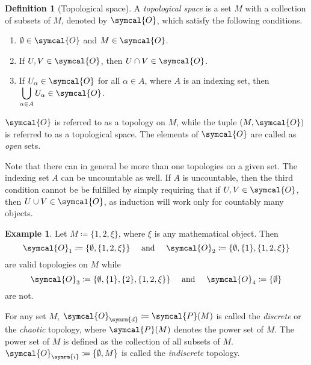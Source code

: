 \documentclass[a4 paper, 12pt]{book}
\theoremstyle{definition}
\newtheorem{defn}{Definition}
\newtheorem{exmp}{Example}
\newcommand{\topology}{\symcal{O}}
\newcommand{\powerset}{\symcal{P}}
\begin{document}
    \begin{defn}[Topological space]
        A \textit{topological space} is a set \(M\) with a collection of subsets of \(M\), denoted by \(\topology\), which satisfy the following conditions.
        \begin{enumerate}
            \item \(\emptyset \in \topology\) and \(M \in \topology\).
            \item If \(U, V \in \topology\), then \(U \cap V \in \topology\).
            \item If \(U_\alpha \in \topology\) for all \(\alpha \in A\), where \(A\) is an indexing set, then \(\displaystyle \bigcup_{\alpha \in A} U_\alpha \in \topology\). \label{topthirdcondition}
        \end{enumerate}
        \(\topology\) is referred to as a topology on \(M\), while the tuple \((M, \topology)\) is referred to as a topological space. The elements of \(\topology\) are called as \textit{open} sets.
    \end{defn}
    Note that there can in general be more than one topologies on a given set. The indexing set \(A\) can be uncountable as well. If \(A\) is uncountable, then the third condition cannot be be fulfilled by simply requiring that if \(U,V \in \topology\), then \(U \cup V \in \topology\), as induction will work only for countably many objects.
    \begin{exmp}
        Let \(M \coloneq \{1, 2, \xi\}\), where \(\xi\) is any mathematical object. Then \[\topology_1 \coloneq \{\emptyset, \{1, 2, \xi\}\} \quad \text{ and } \quad \topology_2 \coloneq \{\emptyset, \{1\}, \{1, 2, \xi\}\}\] are valid topologies on \(M\) while \[\topology_3 \coloneq \{\emptyset, \{1\}, \{2\}, \{1, 2, \xi\}\} \quad \text{ and } \quad \topology_4 \coloneq \{\emptyset\}\] are not.
    \end{exmp}
    For any set \(M\), \(\topology_{\symrm{d}} \coloneq \powerset(M)\) is called the \textit{discrete} or the \textit{chaotic} topology, where \(\powerset(M)\) denotes the power set of \(M\). The power set of \(M\) is defined as the collection of all subsets of \(M\). \(\topology_{\symrm{i}} \coloneq \{\emptyset, M\}\) is called the \textit{indiscrete} topology.
\end{document}
